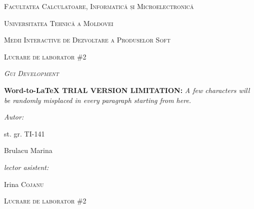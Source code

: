 \documentclass[11pt]{article}
\author{RePack by Diakov}
\title{}
\begin{document}
\begin{center}
\textsc{{\LARGE Facultatea Calculatoare, Informatic\u{a} și
Microelectronic\u{a}}}
\end{center}

\begin{center}
\textsc{{\LARGE Universitatea Tehnic\u{a} a Moldovei}}
\end{center}

\begin{center}
\textsc{{\LARGE Medii Interactive de Dezvoltare a Produselor Soft}}
\end{center}

\begin{center}
\textsc{{\LARGE Lucrare de laborator  \#2}}
\end{center}

\begin{center}
\label{OLE_LINK1}\textit{\textsc{{\Huge Gui Development}}}
\end{center}

\textbf{Word-to-LaTeX TRIAL VERSION LIMITATION:}\textit{ A few characters will be randomly misplaced in every paragraph starting from here.}

\begin{multicols}{2}

{\raggedright
\textit{{\large Autor:}}
}

{\raggedright
{\large st. gr. TI-141 }
}

{\raggedright
{\large Brulacu Marina}
}

{\raggedleft
{\large \textit{lector asistent:} }
}

{\raggedleft
{\large Irina \textsc{Cojanu}}
}

\end{multicols}
\hspace{15pt}\hspace{15pt}\hspace{15pt}\hspace{15pt}\hspace{15pt}\hspace{15pt}\hspace{15pt}\hspace{15pt}\hspace{15pt}\hspace{15pt}\hspace{15pt}\hspace{15pt}\hspace{15pt}\hspace{15pt}
\begin{center}
\textsc{{\Large Lucrare de laborator  \#2}}
\end{center}
\end{document}
